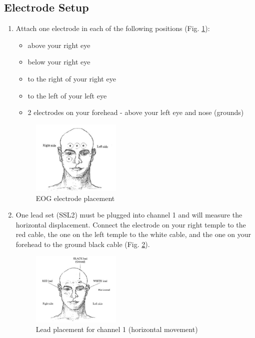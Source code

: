 \documentclass{article}
\begin{document}
\subsection*{Electrode Setup}
\begin{enumerate}
	\item Attach one electrode in each of the following positions (Fig. \ref{setup1}):\begin{itemize}
		\item above your right eye
		\item below your right eye
		\item to the right of your right eye
		\item to the left of your left eye
		\item 2 electrodes on your forehead - above your left eye and nose (grounds)
	\end{itemize}
	
	\begin{figure}[h]
	\centering\includegraphics[width=0.4\textwidth]{../images/EOG_2.jpg}
	\caption{EOG electrode placement}
	\label{setup1}
	\end{figure}
	
	\item One lead set (SSL2) must be plugged into channel 1 and will measure the horizontal displacement. Connect the electrode on your right temple to the red cable, the one on the left temple to the white cable, and the one on your forehead to the ground black cable (Fig. \ref{setup2}). 
	
	\begin{figure}[h]
	\centering\includegraphics[width=0.4\textwidth]{../images/EOG_3.jpg}
	\caption{Lead placement for channel 1 (horizontal movement)}
	\label{setup2}
	\end{figure}
	

\end{enumerate}
\end{document}

